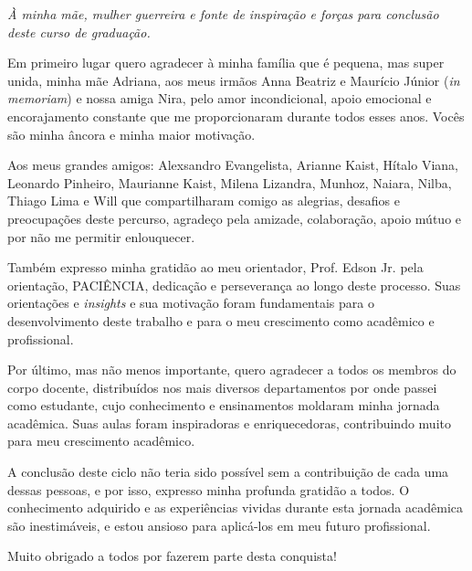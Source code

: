 \documentclass[
	12pt,			%
	openright,		%
	oneside,	
	a4paper,		%
	english,		%
	brazil			%
]{abntex2/abntex2}  %
\begin{document}
	\begin{dedicatoria}
		
		\vspace*{\fill}
		\noindent
		\leftskip=7cm
		\textit{À minha mãe, mulher guerreira e fonte de inspiração e forças para conclusão deste curso de graduação.}
		\vspace{5cm}
	
	\end{dedicatoria}

	\begin{agradecimentos}

		Em primeiro lugar quero agradecer à minha família que é pequena, mas super unida, minha mãe Adriana, aos meus irmãos Anna Beatriz e Maurício Júnior (\textit{in memoriam}) e nossa amiga Nira, pelo amor incondicional, apoio emocional e encorajamento constante que me proporcionaram durante todos esses anos. Vocês são minha âncora e minha maior motivação.
		
		Aos meus grandes amigos: Alexsandro Evangelista, Arianne Kaist, Hítalo Viana, Leonardo Pinheiro, Maurianne Kaist, Milena Lizandra, Munhoz, Naiara, Nilba, Thiago Lima e Will que compartilharam comigo as alegrias, desafios e preocupações deste percurso, agradeço pela amizade, colaboração, apoio mútuo e por não me permitir enlouquecer.
		
		Também expresso minha gratidão ao meu orientador, Prof. Edson Jr. pela orientação, PACIÊNCIA, dedicação e perseverança ao longo deste processo. Suas orientações e \textit{insights} e sua motivação foram fundamentais para o desenvolvimento deste trabalho e para o meu crescimento como acadêmico e profissional.
		
		Por último, mas não menos importante, quero agradecer a todos os membros do corpo docente, distribuídos nos mais diversos departamentos por onde passei como estudante, cujo conhecimento e ensinamentos moldaram minha jornada acadêmica. Suas aulas foram inspiradoras e enriquecedoras, contribuindo muito para meu crescimento acadêmico.
		
		A conclusão deste ciclo não teria sido possível sem a contribuição de cada uma dessas pessoas, e por isso, expresso minha profunda gratidão a todos. O conhecimento adquirido e as experiências vividas durante esta jornada acadêmica são inestimáveis, e estou ansioso para aplicá-los em meu futuro profissional.
		
		Muito obrigado a todos por fazerem parte desta conquista!

	\end{agradecimentos}
\end{document}
